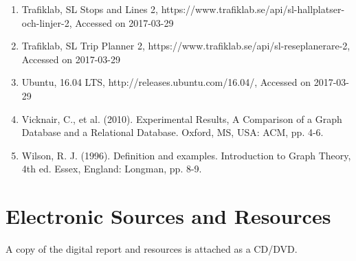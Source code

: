 \documentclass[12pt]{article}   	%
\begin{document}
\begin{enumerate}
\item
Trafiklab, SL Stops and Lines 2, https://www.trafiklab.se/api/sl-hallplatser-och-linjer-2, Accessed on 2017-03-29

\item
Trafiklab, SL Trip Planner 2, https://www.trafiklab.se/api/sl-reseplanerare-2, Accessed on 2017-03-29

\item
Ubuntu, 16.04 LTS, http://releases.ubuntu.com/16.04/, Accessed on 2017-03-29

\item
Vicknair, C., et al. (2010). Experimental Results, A Comparison of a Graph Database and a Relational Database. Oxford, MS, USA: ACM, pp. 4-6.

\item
Wilson, R. J. (1996). Definition and examples. Introduction to Graph Theory, 4th ed. Essex, England: Longman, pp. 8-9.

\end{enumerate}

\newpage

\section{Electronic Sources and Resources}
A copy of the digital report and resources is attached as a CD/DVD.
\end{document}
